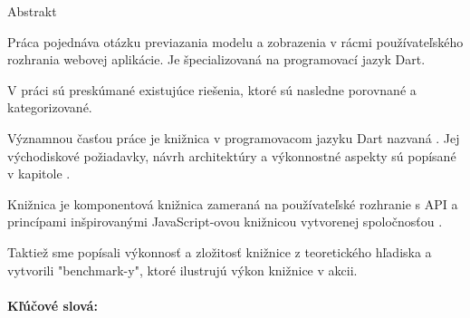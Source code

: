 \noindent
\begin{center}
\begin{minipage}{1\textwidth}
\centerline{\large Abstrakt}
\setlength{\parskip}{0.2cm}
Práca pojednáva otázku previazania modelu a zobrazenia v rácmi používateľského rozhrania webovej aplikácie.
Je špecializovaná na programovací jazyk Dart.

V práci sú preskúmané existujúce riešenia, ktoré sú nasledne porovnané a kategorizované.

Významnou časťou práce je knižnica v programovacom jazyku Dart nazvaná \tiles.
Jej východiskové požiadavky, návrh architektúry a výkonnostné aspekty sú popísané v kapitole .

Knižnica \tiles je komponentová knižnica zameraná na používateľské rozhranie
s API a princípami inšpirovanými JavaScript-ovou knižnicou \react vytvorenej spoločnosťou \facebook.

Taktiež sme popísali výkonnosť a zložitosť knižnice z teoretického hľadiska 
a vytvorili "benchmark-y", ktoré ilustrujú výkon knižnice v akcii.
\\ \\ 
{\bf Kľúčové slová:} \mfkeywordssk
\end{minipage}
\end{center}
\eject %

